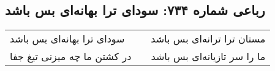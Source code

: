 \begin{center}
\section*{رباعی شماره ۷۳۴: سودای ترا بهانه‌ای بس باشد}
\label{sec:0734}
\begin{longtable}{l p{0.5cm} r}
سودای ترا بهانه‌ای بس باشد
&&
مستان ترا ترانه‌ای بس باشد
\\
در کشتن ما چه میزنی تیغ جفا
&&
ما را سر تازیانه‌ای بس باشد
\\
\end{longtable}
\end{center}
